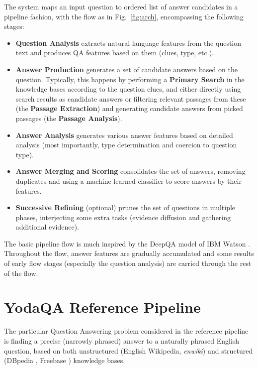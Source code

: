 The system maps an input question to ordered list of answer candidates in a pipeline fashion,
with the flow as in Fig.~\ref{fig:arch}, encompassing the following stages:

\begin{itemize}
\item \textbf{Question Analysis} extracts natural language features from the question text and produces QA features based on them (clues, type, etc.).
\item \textbf{Answer Production} generates a set of candidate answers based on the question.
	Typically, this happens by performing a \textbf{Primary Search} in the knowledge bases according to the question clues,
	and either directly using search results as candidate answers
	or filtering relevant passages from these (the \textbf{Passage Extraction})
	and generating candidate answers from picked passages (the \textbf{Passage Analysis}).
\item \textbf{Answer Analysis} generates various answer features based on detailed analysis (most importantly, type determination and coercion to question type).
\item \textbf{Answer Merging and Scoring} consolidates the set of answers, removing duplicates and using a machine learned classifier to score answers by their features.
\item \textbf{Successive Refining} (optional) prunes the set of questions in multiple phases, interjecting some extra tasks (evidence diffusion and gathering additional evidence).
\end{itemize}

The basic pipeline flow is much inspired by the Deep\-QA model
of IBM Watson \citep{WatsonPipeline}.  Throughout the flow, answer features
are gradually accumulated and some results of early flow stages (especially
the question analysis) are carried through the rest of the flow.


\section{YodaQA Reference Pipeline}
\label{sec:yodaqarefpip}

The particular Question Answering problem considered in the reference
pipeline is finding a precise (narrowly phrased) answer to a naturally
phrased English question, based on both unstructured (English Wikipedia,
\textit{enwiki})
and structured (DBpedia \citep{dbpedia}, Freebase \citep{freebase}) knowledge bases.


